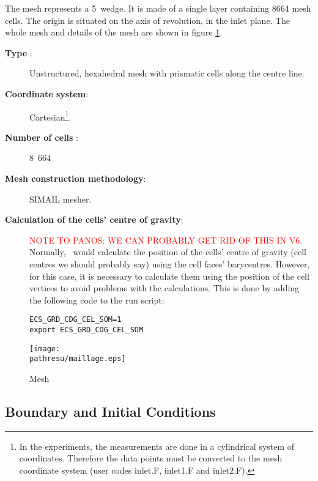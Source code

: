 \documentclass[a4paper,twoside,12pt]{article}
\newcommand{\pathresu}{./FIGURES}
\begin{document}
The mesh represents a 5\degree\ wedge. It is made of a single layer containing 8664 mesh cells. The origin is situated on the axis of revolution, in the inlet plane. The whole mesh and details of the mesh are shown in figure \ref{maillage}.

\begin{description}

   \item[\textbf{Type} :] Unstructured, hexahedral mesh with prismatic cells along the centre line.

   \item[\textbf{Coordinate system}:] Cartesian\footnote{In the experiments, the measurements are done in a cylindrical system of coordinates. Therefore the data points must be converted to the mesh coordinate system (user codes inlet.F,
            inlet1.F and inlet2.F).}.

   \item[\textbf{Number of cells} :] 8~664

   \item[\textbf{Mesh construction methodology}:] SIMAIL mesher.

   \item[\textbf{Calculation of the cells' centre of gravity}:]
         \textcolor{red}{NOTE TO PANOS: WE CAN PROBABLY GET RID OF THIS IN V6.}
         Normally, \CS\ would calculate the position of the cells' centre of gravity (cell centres we should probably say) using the cell faces' barycentres. However, for this case, it is necessary to calculate them using the position of the cell vertices to avoid problems with the calculations. This is done by adding the following code to the run script:

         \begin{verbatim}
ECS_GRD_CDG_CEL_SOM=1
export ECS_GRD_CDG_CEL_SOM
\end{verbatim}

\end{description}

\begin{figure}[h]
   \centerline{\texttt{[image: \\pathresu/maillage.eps]}}
   \caption{\label{maillage}{Mesh}}
\end{figure}

\subsection{Boundary and Initial Conditions}
\end{document}
